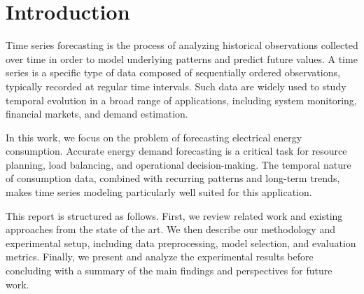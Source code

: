 

\section*{Introduction}

Time series forecasting is the process of analyzing historical observations collected over time in order to model underlying patterns and predict future values. A time series is a specific type of data composed of sequentially ordered observations, typically recorded at regular time intervals. Such data are widely used to study temporal evolution in a broad range of applications, including system monitoring, financial markets, and demand estimation.

\par
In this work, we focus on the problem of forecasting electrical energy consumption. Accurate energy demand forecasting is a critical task for resource planning, load balancing, and operational decision-making. The temporal nature of consumption data, combined with recurring patterns and long-term trends, makes time series modeling particularly well suited for this application.

\par
This report is structured as follows. First, we review related work and existing approaches from the state of the art. We then describe our methodology and experimental setup, including data preprocessing, model selection, and evaluation metrics. Finally, we present and analyze the experimental results before concluding with a summary of the main findings and perspectives for future work.






